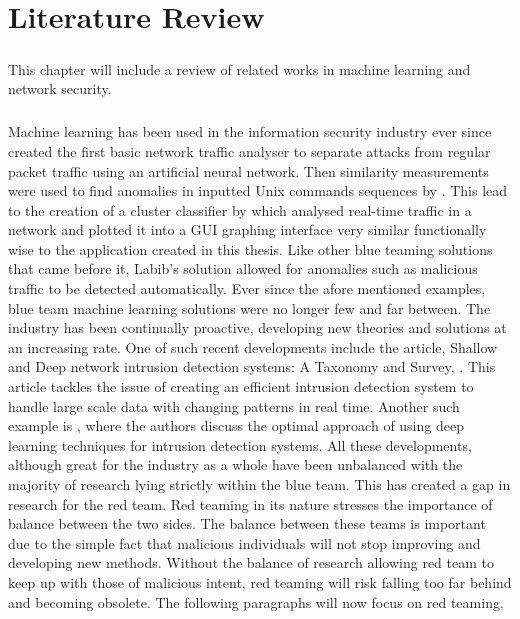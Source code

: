 \chapter{Literature Review}
\label{litreview}

\paragraph{}This chapter will include a review of related works in machine learning and network security.

\paragraph{}Machine learning has been used in the information security industry ever since \cite{debar1992neural} created the first basic network traffic analyser to separate attacks from regular packet traffic using an artificial neural network. Then similarity measurements were used to find anomalies in inputted Unix commands sequences by \cite{lane1997application}. This lead to the creation of a cluster classifier by \cite{labib2002nsom} which analysed real-time traffic in a network and plotted it into a GUI graphing interface very similar functionally wise to the application created in this thesis. Like other blue teaming solutions that came before it, Labib's solution allowed for anomalies such as malicious traffic to be detected automatically. Ever since the afore mentioned examples, blue team machine learning solutions were no longer few and far between. The industry has been continually proactive, developing new theories and solutions at an increasing rate. One of such recent developments include the article, Shallow and Deep network intrusion detection systems: A Taxonomy and Survey, \cite{hodo2017shallow}. This article tackles the issue of creating an efficient intrusion detection system to handle large scale data with changing patterns in real time. Another such example is \cite{niyaz2016deep}, where the authors discuss the optimal approach of using deep learning techniques for intrusion detection systems. All these developments, although great for the industry as a whole have been unbalanced with the majority of research lying strictly within the blue team. This has created a gap in research for the red team. Red teaming in its nature stresses the importance of balance between the two sides. The balance between these teams is important due to the simple fact that malicious individuals will not stop improving and developing new methods. Without the balance of research allowing red team to keep up with those of malicious intent, red teaming will risk falling too far behind and becoming obsolete. The following paragraphs will now focus on red teaming.

